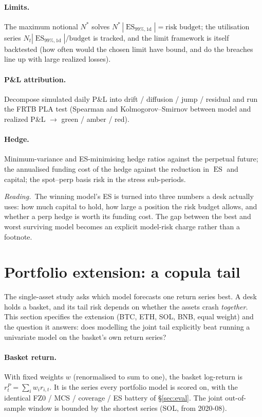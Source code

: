 \documentclass[11pt,a4paper]{article}
\newcommand{\ES}{\operatorname{ES}}
\newcommand{\intuition}[1]{\par\smallskip\noindent\textit{Reading.}\ #1\par\smallskip}
\begin{document}
\paragraph{Limits.} The maximum notional $N^{\ast}$ solves
$N^{\ast}\,|\ES_{99\%,1\text{d}}| = \text{risk budget}$; the utilisation series
$N_t|\ES_{99\%,1\text{d}}|/\text{budget}$ is tracked, and the limit framework is
itself backtested (how often would the chosen limit have bound, and do the
breaches line up with large realized losses).

\paragraph{P\&L attribution.} Decompose simulated daily P\&L into drift /
diffusion / jump / residual and run the FRTB PLA test (Spearman and
Kolmogorov--Smirnov between model and realized P\&L $\to$ green / amber / red).

\paragraph{Hedge.} Minimum-variance and ES-minimising hedge ratios against the
perpetual future; the annualised funding cost of the hedge against the reduction
in $\ES$ and capital; the spot--perp basis risk in the stress sub-periods.

\intuition{The winning model's ES is turned into three numbers a desk actually
uses: how much capital to hold, how large a position the risk budget allows, and
whether a perp hedge is worth its funding cost. The gap between the best and
worst surviving model becomes an explicit model-risk charge rather than a
footnote.}

\section{Portfolio extension: a copula tail}\label{sec:portfolio}

The single-asset study asks which model forecasts one return series best. A
desk holds a basket, and its tail risk depends on whether the assets crash
\emph{together}. This section specifies the extension (BTC, ETH, SOL, BNB, equal
weight) and the question it answers: does modelling the joint tail explicitly
beat running a univariate model on the basket's own return series?

\paragraph{Basket return.} With fixed weights $w$ (renormalised to sum to one),
the basket log-return is $r^{P}_t=\sum_i w_i r_{i,t}$. It is the series every
portfolio model is scored on, with the identical FZ0 / MCS / coverage / ES
battery of \S\ref{sec:eval}. The joint out-of-sample window is bounded by the
shortest series (SOL, from 2020-08).
\end{document}
